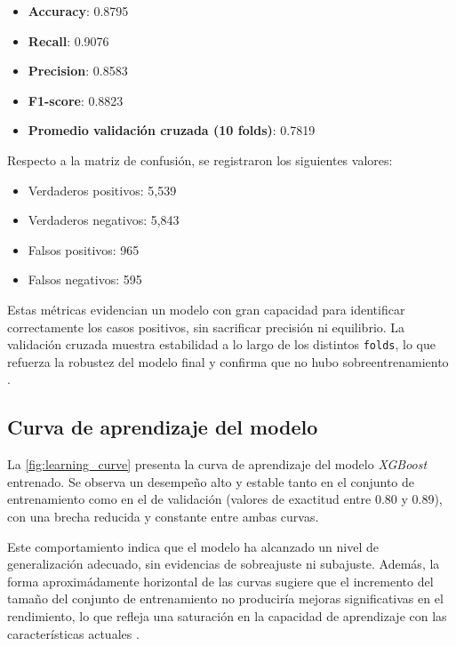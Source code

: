 \documentclass[12pt]{article}
\begin{document}
\begin{itemize}
    \item \textbf{Accuracy}: 0.8795
    \item \textbf{Recall}: 0.9076
    \item \textbf{Precision}: 0.8583
    \item \textbf{F1-score}: 0.8823
    \item \textbf{Promedio validación cruzada (10 folds)}: 0.7819
\end{itemize}

\noindent Respecto a la matriz de confusión, se registraron los siguientes valores:

\begin{itemize}
    \item Verdaderos positivos: 5,539
    \item Verdaderos negativos: 5,843
    \item Falsos positivos: 965
    \item Falsos negativos: 595
\end{itemize}

Estas métricas evidencian un modelo con gran capacidad para identificar correctamente los casos positivos, sin sacrificar precisión ni equilibrio. La validación cruzada muestra estabilidad a lo largo de los distintos \texttt{folds}, lo que refuerza la robustez del modelo final y confirma que no hubo sobreentrenamiento \parencite{geron2019hands}.

\subsection{Curva de aprendizaje del modelo}

La \autoref{fig:learning_curve} presenta la curva de aprendizaje del modelo \textit{XGBoost} entrenado. Se observa un desempeño alto y estable tanto en el conjunto de entrenamiento como en el de validación (valores de exactitud entre 0.80 y 0.89), con una brecha reducida y constante entre ambas curvas.

Este comportamiento indica que el modelo ha alcanzado un nivel de generalización adecuado, sin evidencias de sobreajuste ni subajuste. Además, la forma aproximádamente horizontal de las curvas sugiere que el incremento del tamaño del conjunto de entrenamiento no produciría mejoras significativas en el rendimiento, lo que refleja una saturación en la capacidad de aprendizaje con las características actuales \parencite{raschka2018, chen2015}.
\end{document}
